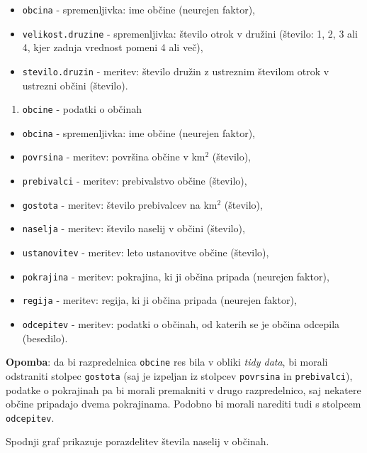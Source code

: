 \documentclass[]{article}
\providecommand{\tightlist}{%
  \setlength{\itemsep}{0pt}\setlength{\parskip}{0pt}}
\begin{document}
\begin{itemize}
\tightlist
\item
  \texttt{obcina} - spremenljivka: ime občine (neurejen faktor),
\item
  \texttt{velikost.druzine} - spremenljivka: število otrok v družini
  (število: 1, 2, 3 ali 4, kjer zadnja vrednost pomeni 4 ali več),
\item
  \texttt{stevilo.druzin} - meritev: število družin z ustreznim številom
  otrok v ustrezni občini (število).
\end{itemize}

\begin{enumerate}
\def\labelenumi{\arabic{enumi}.}
\setcounter{enumi}{1}
\tightlist
\item
  \texttt{obcine} - podatki o občinah
\end{enumerate}

\begin{itemize}
\tightlist
\item
  \texttt{obcina} - spremenljivka: ime občine (neurejen faktor),
\item
  \texttt{povrsina} - meritev: površina občine v km\(^2\) (število),
\item
  \texttt{prebivalci} - meritev: prebivalstvo občine (število),
\item
  \texttt{gostota} - meritev: število prebivalcev na km\(^2\) (število),
\item
  \texttt{naselja} - meritev: število naselij v občini (število),
\item
  \texttt{ustanovitev} - meritev: leto ustanovitve občine (število),
\item
  \texttt{pokrajina} - meritev: pokrajina, ki ji občina pripada
  (neurejen faktor),
\item
  \texttt{regija} - meritev: regija, ki ji občina pripada (neurejen
  faktor),
\item
  \texttt{odcepitev} - meritev: podatki o občinah, od katerih se je
  občina odcepila (besedilo).
\end{itemize}

\textbf{Opomba}: da bi razpredelnica \texttt{obcine} res bila v obliki
\emph{tidy data}, bi morali odstraniti stolpec \texttt{gostota} (saj je
izpeljan iz stolpcev \texttt{povrsina} in \texttt{prebivalci}), podatke
o pokrajinah pa bi morali premakniti v drugo razpredelnico, saj nekatere
občine pripadajo dvema pokrajinama. Podobno bi morali narediti tudi s
stolpcem \texttt{odcepitev}.

Spodnji graf prikazuje porazdelitev števila naselij v občinah.
\end{document}
